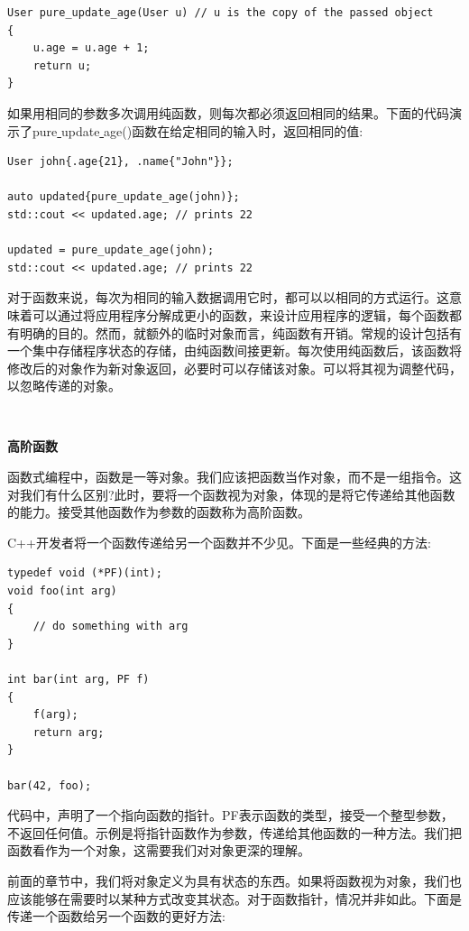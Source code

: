 \begin{lstlisting}[caption={}]
User pure_update_age(User u) // u is the copy of the passed object
{
	u.age = u.age + 1;
	return u;
}
\end{lstlisting}

如果用相同的参数多次调用纯函数，则每次都必须返回相同的结果。下面的代码演示了pure\underline{ }update\underline{ }age()函数在给定相同的输入时，返回相同的值: \par

\begin{lstlisting}[caption={}]
User john{.age{21}, .name{"John"}};

auto updated{pure_update_age(john)};
std::cout << updated.age; // prints 22

updated = pure_update_age(john);
std::cout << updated.age; // prints 22
\end{lstlisting}

对于函数来说，每次为相同的输入数据调用它时，都可以以相同的方式运行。这意味着可以通过将应用程序分解成更小的函数，来设计应用程序的逻辑，每个函数都有明确的目的。然而，就额外的临时对象而言，纯函数有开销。常规的设计包括有一个集中存储程序状态的存储，由纯函数间接更新。每次使用纯函数后，该函数将修改后的对象作为新对象返回，必要时可以存储该对象。可以将其视为调整代码，以忽略传递的对象。 \par

\noindent\textbf{}\ \par
\textbf{高阶函数} \ \par
函数式编程中，函数是一等对象。我们应该把函数当作对象，而不是一组指令。这对我们有什么区别?此时，要将一个函数视为对象，体现的是将它传递给其他函数的能力。接受其他函数作为参数的函数称为高阶函数。 \par
C++开发者将一个函数传递给另一个函数并不少见。下面是一些经典的方法: \par

\begin{lstlisting}[caption={}]
typedef void (*PF)(int);
void foo(int arg)
{
	// do something with arg
}

int bar(int arg, PF f)
{
	f(arg);
	return arg;
}

bar(42, foo);
\end{lstlisting}

代码中，声明了一个指向函数的指针。PF表示函数的类型，接受一个整型参数，不返回任何值。示例是将指针函数作为参数，传递给其他函数的一种方法。我们把函数看作为一个对象，这需要我们对对象更深的理解。 \par
前面的章节中，我们将对象定义为具有状态的东西。如果将函数视为对象，我们也应该能够在需要时以某种方式改变其状态。对于函数指针，情况并非如此。下面是传递一个函数给另一个函数的更好方法: \par

